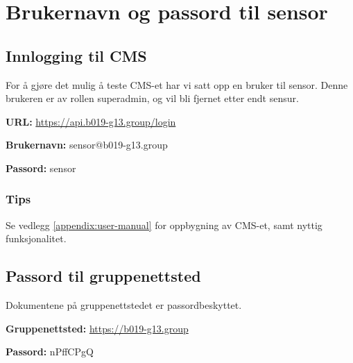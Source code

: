 \chapter{Brukernavn og passord til sensor}
\label{appendix:login-cms} 

\section*{Innlogging til CMS}
For å gjøre det mulig å teste CMS-et har vi satt opp en bruker til sensor. Denne brukeren er av rollen superadmin, og vil bli fjernet etter endt sensur.

\textbf{URL:}
\url{https://api.b019-g13.group/login}

\textbf{Brukernavn:}
sensor@b019-g13.group

\textbf{Passord:}
sensor

\subsection*{Tips}
Se vedlegg \ref{appendix:user-manual} for oppbygning av CMS-et, samt nyttig funksjonalitet.

\section*{Passord til gruppenettsted}
Dokumentene på gruppenettstedet er passordbeskyttet.

\textbf{Gruppenettsted:}
\url{https://b019-g13.group}

\textbf{Passord:}
nPffCPgQ
